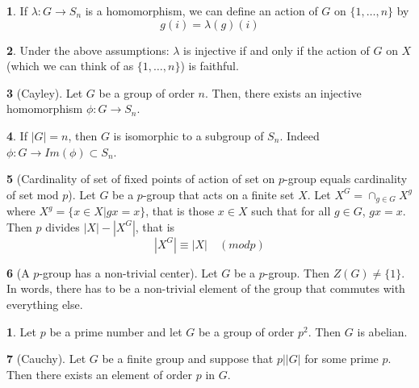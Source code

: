 \documentclass[12pt]{article}
\theoremstyle{definition}
\newtheorem{theorem}{\color{ForestGreen}{\textbf{Theorem}}}
\newtheorem{corollary}{\color{ForestGreen}{\textbf{Corollary}}}
\begin{document}
\begin{theorem}
If $\lambda : G \to S_n$ is a homomorphism, we can define an action of $G$ on $\{1,\ldots, n\}$ by
\begin{equation}
g(i) = \lambda(g)(i)
\end{equation}
\end{theorem}

\begin{theorem}
Under the above assumptions: $\lambda$ is injective if and only if the action of $G$ on $X$ (which we can think of as $\{1,\ldots, n\}$) is faithful.
\end{theorem}

\begin{theorem}[Cayley]
Let $G$ be a group of order $n$. Then, there exists an injective homomorphism $\phi : G \to S_n$.
\end{theorem}

\begin{theorem}
If $|G| = n$, then $G$ is isomorphic to a subgroup of $S_n$. Indeed $\phi : G \to Im(\phi) \subset S_n$.
\end{theorem}

\begin{theorem}[Cardinality of set of fixed points of action of set on $p$-group equals cardinality of set mod $p$]\label{lemma:favlemma}
Let $G$ be a $p$-group that acts on a finite set $X$. Let $X^G = \cap_{g \in G} X^g$ where $X^g = \{x\in X| gx =x\}$, that is those $x\in X$ such that for all $g\in G$, $gx = x$. Then $p$ divides $|X| - |X^G|$, that is
\begin{equation}
|X^G| \equiv |X| \quad (mod p)
\end{equation}
\end{theorem}

\begin{theorem}[A $p$-group has a non-trivial center]
Let $G$ be a $p$-group. Then $Z(G) \neq \{1\}$.  In words, there has to be a non-trivial element of the group that commutes with everything else.
\end{theorem}

\begin{corollary}
Let $p$ be a prime number and let $G$ be a group of order $p^2$. Then $G$ is abelian.
\end{corollary}

\begin{theorem}[Cauchy]
Let $G$ be a finite group and suppose that $p \big\vert |G|$ for some prime $p$. Then there exists an element of order $p$ in $G$.
\end{theorem}
\end{document}
